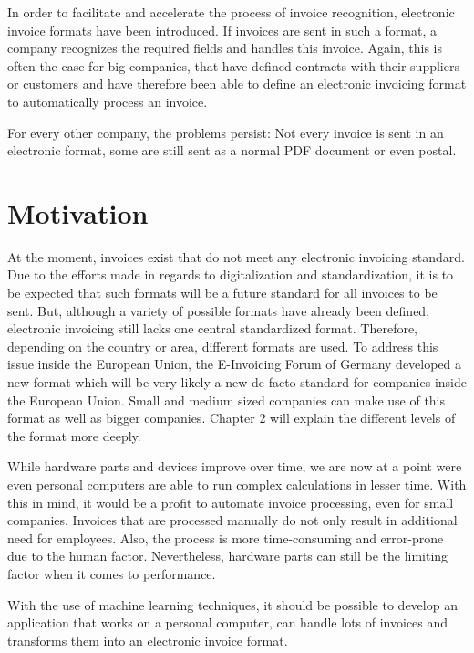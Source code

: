 In order to facilitate and accelerate the process of invoice recognition, electronic invoice formats have been introduced. If invoices are sent in such a format, a company recognizes the required fields and handles this invoice. Again, this is often the case for big companies, that have defined contracts with their suppliers or customers and have therefore been able to define an electronic invoicing format to automatically process an invoice.

For every other company, the problems persist: Not every invoice is sent in an electronic format, some are still sent as a normal PDF document or even postal.

\section{Motivation}
\label{sec1.2}

At the moment, invoices exist that do not meet any electronic invoicing standard. Due to the efforts made in regards to digitalization and standardization, it is to be expected that such formats will be a future standard for all invoices to be sent. But, although a variety of possible formats have already been defined, electronic invoicing still lacks one central standardized format.
Therefore, depending on the country or area, different formats are used. To address this issue inside the European Union, the E-Invoicing Forum of Germany developed a new format which will be very likely a new de-facto standard for companies inside the European Union. Small and medium sized companies can make use of this format as well as bigger companies. Chapter 2 will explain the different levels of the format more deeply.

While hardware parts and devices improve over time, we are now at a point were even personal computers are able to run complex calculations in lesser time. With this in mind, it would be a profit to automate invoice processing, even for small companies. Invoices that are processed manually do not only result in additional need for employees. Also, the process is more time-consuming and error-prone due to the human factor. Nevertheless, hardware parts can still be the limiting factor when it comes to performance.

With the use of machine learning techniques, it should be possible to develop an application that works on a personal computer, can handle lots of invoices and transforms them into an electronic invoice format.

